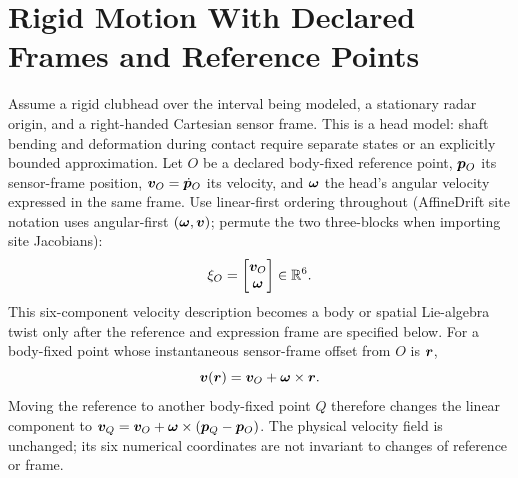 \section{Rigid Motion With Declared Frames and Reference Points}
\label{sec:screw-primer}

Assume a rigid clubhead over the interval being modeled, a stationary radar origin, and a right-handed Cartesian sensor frame.
This is a head model: shaft bending and deformation during contact require separate states or an explicitly bounded approximation.
Let $O$ be a declared body-fixed reference point, $\bm{p}_O$ its sensor-frame position, $\bm{v}_O=\dot{\bm{p}}_O$ its velocity, and $\bm{\omega}$ the head's angular velocity expressed in the same frame.
Use linear-first ordering throughout (AffineDrift site notation uses angular-first
$(\bm{\omega},\bm{v})$; permute the two three-blocks when importing site Jacobians):
\begin{equation}
\label{eq:screw-twist}
\xi_O=\begin{bmatrix}\bm{v}_O\\\bm{\omega}\end{bmatrix}\in\mathbb R^6.
\end{equation}
This six-component velocity description becomes a body or spatial Lie-algebra twist only after the reference and expression frame are specified below.
For a body-fixed point whose instantaneous sensor-frame offset from $O$ is $\bm{r}$,
\begin{equation}
\label{eq:screw-pointvel}
\bm{v}(\bm{r})=\bm{v}_O+\bm{\omega}\times\bm{r}.
\end{equation}
Moving the reference to another body-fixed point $Q$ therefore changes the linear component to $\bm{v}_Q=\bm{v}_O+\bm{\omega}\times(\bm{p}_Q-\bm{p}_O)$.
The physical velocity field is unchanged; its six numerical coordinates are not invariant to changes of reference or frame.


